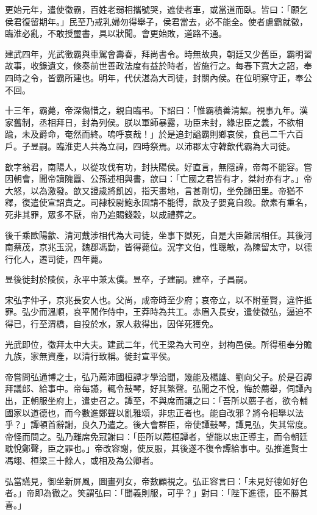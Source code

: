 \begin{pinyinscope}
更始元年，遣使徵霸，百姓老弱相攜號哭，遮使者車，或當道而臥。皆曰：「願乞侯君復留期年。」民至乃戒乳婦勿得舉子，侯君當去，必不能全。使者慮霸就徵，臨淮必亂，不敢授璽書，具以狀聞。會更始敗，道路不通。

建武四年，光武徵霸與車駕會壽春，拜尚書令。時無故典，朝廷又少舊臣，霸明習故事，收錄遺文，條奏前世善政法度有益於時者，皆施行之。每春下寬大之詔，奉四時之令，皆霸所建也。明年，代伏湛為大司徒，封關內侯。在位明察守正，奉公不回。

十三年，霸薨，帝深傷惜之，親自臨弔。下詔曰：「惟霸積善清絜。視事九年。漢家舊制，丞相拜日，封為列侯。朕以軍師暴露，功臣未封，緣忠臣之義，不欲相踰，未及爵命，奄然而終。嗚呼哀哉！」於是追封謚霸則鄉哀侯，食邑二千六百戶。子昱嗣。臨淮吏人共為立祠，四時祭焉。以沛郡太守韓歆代霸為大司徒。

歆字翁君，南陽人，以從攻伐有功，封扶陽侯。好直言，無隱諱，帝每不能容。嘗因朝會，聞帝讀隗囂、公孫述相與書，歆曰：「亡國之君皆有才，桀紂亦有才。」帝大怒，以為激發。歆又證歲將飢凶，指天畫地，言甚剛切，坐免歸田里。帝猶不釋，復遣使宣詔責之。司隸校尉鮑永固請不能得，歆及子嬰竟自殺。歆素有重名，死非其罪，眾多不厭，帝乃追賜錢穀，以成禮葬之。

後千乘歐陽歙、清河戴涉相代為大司徒，坐事下獄死，自是大臣難居相任。其後河南蔡茂，京兆玉況，魏郡馮勤，皆得薨位。況字文伯，性聰敏，為陳留太守，以德行化人，遷司徒，四年薨。

昱後徙封於陵侯，永平中兼太僕。昱卒，子建嗣。建卒，子昌嗣。

宋弘字仲子，京兆長安人也。父尚，成帝時至少府；哀帝立，以不附董賢，違忤抵罪。弘少而溫順，哀平閒作侍中，王莽時為共工。赤眉入長安，遣使徵弘，逼迫不得已，行至渭橋，自投於水，家人救得出，因佯死獲免。

光武即位，徵拜太中大夫。建武二年，代王梁為大司空，封栒邑侯。所得租奉分贍九族，家無資產，以清行致稱。徙封宣平侯。

帝嘗問弘通博之士，弘乃薦沛國桓譚才學洽聞，幾能及楊雄、劉向父子。於是召譚拜議郎、給事中。帝每讌，輒令鼓琴，好其繁聲。弘聞之不悅，悔於薦舉，伺譚內出，正朝服坐府上，遣吏召之。譚至，不與席而讓之曰：「吾所以薦子者，欲令輔國家以道德也，而今數進鄭聲以亂雅頌，非忠正者也。能自改邪？將令相舉以法乎？」譚頓首辭謝，良久乃遣之。後大會群臣，帝使譚鼓琴，譚見弘，失其常度。帝怪而問之。弘乃離席免冠謝曰：「臣所以薦桓譚者，望能以忠正導主，而令朝廷耽悅鄭聲，臣之罪也。」帝改容謝，使反服，其後遂不復令譚給事中。弘推進賢士馮翊、桓梁三十餘人，或相及為公卿者。

弘當讌見，御坐新屏風，圖畫列女，帝數顧視之。弘正容言曰：「未見好德如好色者。」帝即為徹之。笑謂弘曰：「聞義則服，可乎？」對曰：「陛下進德，臣不勝其喜。」


\end{pinyinscope}
